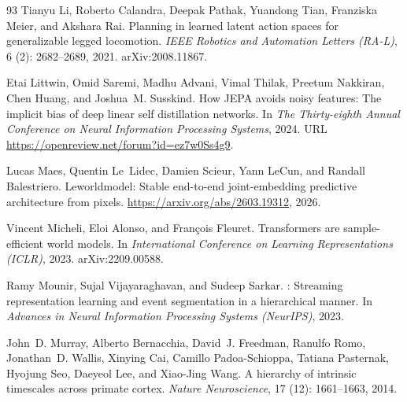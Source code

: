 \begin{thebibliography}{93}
Tianyu Li, Roberto Calandra, Deepak Pathak, Yuandong Tian, Franziska Meier, and
  Akshara Rai.
\newblock Planning in learned latent action spaces for generalizable legged
  locomotion.
\newblock \emph{IEEE Robotics and Automation Letters (RA-L)}, 6
  (2): 2682--2689, 2021.
\newblock arXiv:2008.11867.

Etai Littwin, Omid Saremi, Madhu Advani, Vimal Thilak, Preetum Nakkiran, Chen
  Huang, and Joshua~M. Susskind.
\newblock How {JEPA} avoids noisy features: The implicit bias of deep linear
  self distillation networks.
\newblock In \emph{The Thirty-eighth Annual Conference on Neural Information
  Processing Systems}, 2024.
\newblock URL \url{https://openreview.net/forum?id=ez7w0Ss4g9}.

Lucas Maes, Quentin Le~Lidec, Damien Scieur, Yann LeCun, and Randall
  Balestriero.
\newblock Leworldmodel: Stable end-to-end joint-embedding predictive
  architecture from pixels.
\newblock \url{https://arxiv.org/abs/2603.19312}, 2026.

Vincent Micheli, Eloi Alonso, and Fran\c{c}ois Fleuret.
\newblock Transformers are sample-efficient world models.
\newblock In \emph{International Conference on Learning Representations
  (ICLR)}, 2023.
\newblock arXiv:2209.00588.

Ramy Mounir, Sujal Vijayaraghavan, and Sudeep Sarkar.
: Streaming representation learning and event segmentation
  in a hierarchical manner.
\newblock In \emph{Advances in Neural Information Processing Systems
  (NeurIPS)}, 2023.

John~D. Murray, Alberto Bernacchia, David~J. Freedman, Ranulfo Romo,
  Jonathan~D. Wallis, Xinying Cai, Camillo Padoa-Schioppa, Tatiana Pasternak,
  Hyojung Seo, Daeyeol Lee, and Xiao-Jing Wang.
\newblock A hierarchy of intrinsic timescales across primate cortex.
\newblock \emph{Nature Neuroscience}, 17 (12): 1661--1663,
  2014.


\end{thebibliography}
